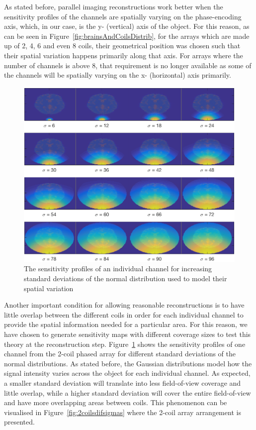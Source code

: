 As stated before, parallel imaging reconstructions work better when the sensitivity profiles of the channels are spatially varying on the phase-encoding axis, which, in our case, is the y- (vertical) axis of the object. For this reason, as can be seen in Figure~\ref{fig:brainsAndCoilsDistrib}, for the arrays which are made up of 2, 4, 6 and even 8 coils, their geometrical position was chosen such that their spatial variation happens primarily along that axis. For arrays where the number of channels is above 8, that requirement is no longer available as some of the channels will be spatially varying on the x- (horizontal) axis primarily. 

\begin{figure}[H]
    \centering
    \includegraphics[width=1\textwidth,keepaspectratio]{1coildifsigmas}
    \caption{The sensitivity profiles of an individual channel for increasing standard deviations of the normal distribution used to model their spatial variation}
    \label{fig:1coildifsigmas}
\end{figure}

Another important condition for allowing reasonable reconstructions is to have little overlap between the different coils in order for each individual channel to provide the spatial information needed for a particular area. For this reason, we have chosen to generate sensitivity maps with different coverage sizes to test this theory at the reconstruction step. Figure~\ref{fig:1coildifsigmas} shows the sensitivity profiles of one channel from the 2-coil phased array for different standard deviations of the normal distributions.
As stated before, the Gaussian distributions model how the signal intensity varies across the object for each individual channel. As expected, a smaller standard deviation will translate into less field-of-view coverage and little overlap, while a higher standard deviation will cover the entire field-of-view and have more overlapping areas between coils. This phenomenon can be visualised in Figure~\ref{fig:2coilsdifsigmas} where the 2-coil array arrangement is presented.

